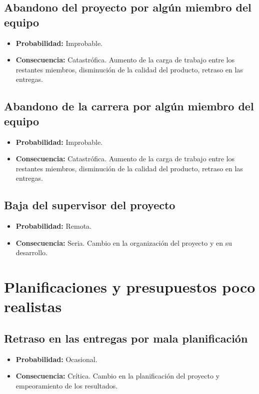\documentclass[spanish,a4paper,12pt]{report}	%
\begin{document}
\subsection*{Abandono del proyecto por algún miembro del equipo}	
	\begin{itemize}
		\item \textbf {Probabilidad: }Improbable.
		\item \textbf {Consecuencia: }Catastrófica. Aumento de la carga de trabajo entre los restantes miembros, disminución de la calidad del producto, retraso en las entregas.
	\end{itemize}

\subsection*{Abandono de la carrera por algún miembro del equipo}
	\begin{itemize}
		\item \textbf {Probabilidad: }Improbable.
		\item \textbf {Consecuencia: }Catastrófica. Aumento de la carga de trabajo entre los restantes miembros, disminución de la calidad del producto, retraso en las entregas.
	\end{itemize}

\subsection*{Baja del supervisor del proyecto}
	\begin{itemize}
		\item \textbf {Probabilidad: }Remota.
		\item \textbf {Consecuencia: }Seria. Cambio en la organización del proyecto y en su desarrollo.
	\end{itemize}

%
\section{Planificaciones y presupuestos poco realistas}

\subsection*{Retraso en las entregas por mala planificación}
	\begin{itemize}
		\item \textbf {Probabilidad: }Ocasional.
		\item \textbf {Consecuencia: }Crítica. Cambio en la planificación del proyecto y empeoramiento de los resultados.
	\end{itemize}
\end{document}
